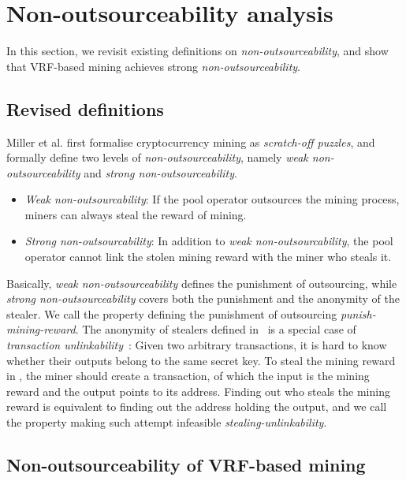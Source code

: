 \section{Non-outsourceability analysis}
\label{sec:non_outsourceability}

In this section, we revisit existing definitions on \emph{non-outsourceability}, and show that VRF-based mining achieves strong \emph{non-outsourceability}.

\subsection{Revised definitions}

Miller et al. \cite{miller2015nonoutsourceable} first formalise cryptocurrency mining as \emph{scratch-off puzzles}, and formally define two levels of \emph{non-outsourceability}, namely \emph{weak non-outsourceability} and \emph{strong non-outsourceability}.

\begin{itemize}
    \item \emph{Weak non-outsourcability}: If the pool operator outsources the mining process, miners can always steal the reward of mining.
    \item \emph{Strong non-outsourcability}: In addition to \emph{weak non-outsourcability}, the pool operator cannot link the stolen mining reward with the miner who steals it.
\end{itemize}

Basically, \emph{weak non-outsourceability} defines the punishment of outsourcing, while \emph{strong non-outsourceability} covers both the punishment and the anonymity of the stealer.
We call the property defining the punishment of outsourcing \emph{punish-mining-reward}.
The anonymity of stealers defined in~\cite{miller2015nonoutsourceable} is a special case of \emph{transaction unlinkability}~\cite{van2013cryptonote}: Given two arbitrary transactions, it is hard to know whether their outputs belong to the same secret key.
To steal the mining reward in \cite{miller2015nonoutsourceable}, the miner should create a transaction, of which the input is the mining reward and the output points to its address.
Finding out who steals the mining reward is equivalent to finding out the address holding the output, and we call the property making such attempt infeasible \emph{stealing-unlinkability}.




\subsection{Non-outsourceability of VRF-based mining}

